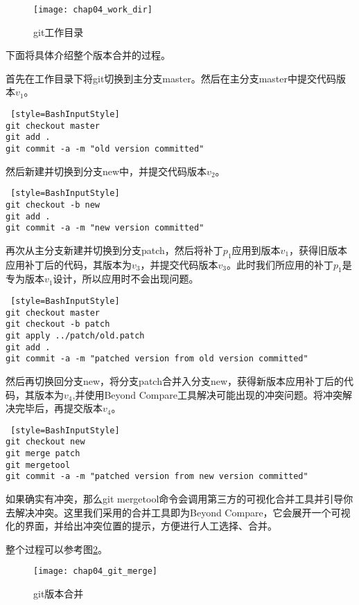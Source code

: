 \begin{figure}[H]
	\centering
	\texttt{[image: chap04\_work\_dir]}
	\caption {git工作目录}
	\label {git_work_dir}	
\end{figure}

下面将具体介绍整个版本合并的过程。


首先在工作目录下将git切换到主分支master。然后在主分支master中提交代码版本$v_1$。

\begin{lstlisting} [style=BashInputStyle]
git checkout master
git add .
git commit -a -m "old version committed"
\end{lstlisting}

然后新建并切换到分支new中，并提交代码版本$v_2$。
\begin{lstlisting} [style=BashInputStyle]
git checkout -b new
git add .
git commit -a -m "new version committed"
\end{lstlisting}

再次从主分支新建并切换到分支patch，然后将补丁$p_1$应用到版本$v_1$，获得旧版本应用补丁后的代码，其版本为$v_3$，并提交代码版本$v_3$。此时我们所应用的补丁$p_1$是专为版本$v_1$设计，所以应用时不会出现问题。

\begin{lstlisting} [style=BashInputStyle]
git checkout master
git checkout -b patch
git apply ../patch/old.patch
git add .
git commit -a -m "patched version from old version committed"
\end{lstlisting}

然后再切换回分支new，将分支patch合并入分支new，获得新版本应用补丁后的代码，其版本为$v_4$,并使用Beyond Compare工具解决可能出现的冲突问题。将冲突解决完毕后，再提交版本$v_4$。

\begin{lstlisting} [style=BashInputStyle]
git checkout new
git merge patch
git mergetool
git commit -a -m "patched version from new version committed"
\end{lstlisting}

如果确实有冲突，那么git mergetool命令会调用第三方的可视化合并工具并引导你去解决冲突。这里我们采用的合并工具即为Beyond Compare，它会展开一个可视化的界面，并给出冲突位置的提示，方便进行人工选择、合并。

整个过程可以参考图\ref {git_merge}。

\begin{figure}[H]
	\centering
	\texttt{[image: chap04\_git\_merge]}
	\caption {git版本合并}
	\label {git_merge}	
\end{figure}


